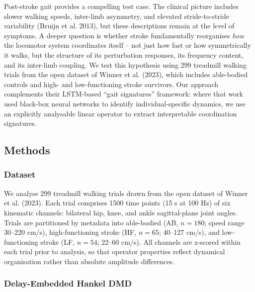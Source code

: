 \documentclass[
  letterpaper,
  DIV=11,
  numbers=noendperiod]{scrartcl}
\begin{document}
Post-stroke gait provides a compelling test case. The clinical picture
includes slower walking speeds, inter-limb asymmetry, and elevated
stride-to-stride variability (Bruijn et al. 2013), but these
descriptions remain at the level of symptoms. A deeper question is
whether stroke fundamentally reorganises \emph{how} the locomotor system
coordinates itself -- not just how fast or how symmetrically it walks,
but the structure of its perturbation responses, its frequency content,
and its inter-limb coupling. We test this hypothesis using 299 treadmill
walking trials from the open dataset of Winner et al. (2023), which
includes able-bodied controls and high- and low-functioning stroke
survivors. Our approach complements their LSTM-based ``gait signatures''
framework: where that work used black-box neural networks to identify
individual-specific dynamics, we use an explicitly analysable linear
operator to extract interpretable coordination signatures.

\subsection{Methods}\label{methods}

\subsubsection{Dataset}\label{dataset}

We analyse 299 treadmill walking trials drawn from the open dataset of
Winner et al. (2023). Each trial comprises 1500 time points (15 s at 100
Hz) of six kinematic channels: bilateral hip, knee, and ankle
sagittal-plane joint angles. Trials are partitioned by metadata into
able-bodied (AB, \(n = 180\); speed range 30--220 cm/s),
high-functioning stroke (HF, \(n = 65\); 40--127 cm/s), and
low-functioning stroke (LF, \(n = 54\); 22--60 cm/s). All channels are
z-scored within each trial prior to analysis, so that operator
properties reflect dynamical organisation rather than absolute amplitude
differences.

\subsubsection{Delay-Embedded Hankel
DMD}\label{delay-embedded-hankel-dmd}
\end{document}
